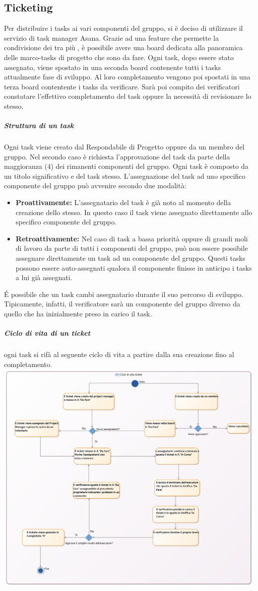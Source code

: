 \documentclass[NormeDiProgetto.tex]{subfiles}
\begin{document}
	\subsection{Ticketing}
	Per distribuire i tasks ai vari componenti del gruppo, si è deciso di utilizzare il servizio di task manager Asana. Grazie ad una feature che permette la condivisione dei  tra più , è possibile avere una board dedicata alla panoramica delle marco-tasks di progetto che sono da fare. Ogni task, dopo essere stato assegnato, viene spostato in una seconda board contenente tutti i tasks attualmente fase di sviluppo. Al loro completamento vengono poi spostati in una terza board contentente i tasks da verificare. Sarà poi compito dei verificatori constatare l'effettivo completamento del task oppure la necessità di revisionare lo stesso.
	\subparagraph{Struttura di un task}
	Ogni task viene creato dal Respondabile di Progetto oppure da un membro del gruppo. Nel secondo caso è richiesta l'approvazione del task da parte della maggioranza (4) dei rimanenti componenti del gruppo.
	Ogni task è composto da un titolo significativo e  del task stesso.
	L'assegnazione del task ad uno specifico componente del gruppo può avvenire secondo due modalità:\\
	\begin{itemize}
		\item \textbf{Proattivamente:} L'assegnatario del task è già noto al momento della creazione dello stesso. In questo caso il task viene assegnato direttamente allo specifico componente del gruppo. 
		\item \textbf{Retroattivamente:} Nel caso di task a bassa priorità oppure di grandi moli di lavoro da parte di tutti i componenti del gruppo, può non essere possibile assegnare direttamente un task ad un componente del gruppo. Questi tasks possono essere auto-assegnati qualora il componente finisse in anticipo i tasks a lui già assegnati.
	\end{itemize}
	\'{E} possibile che un task cambi assegnatario durante il suo percorso di sviluppo. Tipicamente, infatti, il verificatore sarà un componente del gruppo diverso da quello che ha inizialmente preso in carico il task.
	\subparagraph{Ciclo di vita di un ticket}
	ogni task si rifà al seguente ciclo di vita a partire dalla sua creazione fino al completamento.\\
	\includegraphics[scale=0.3]{../../common/images/AsanaFlow}
\end{document}
